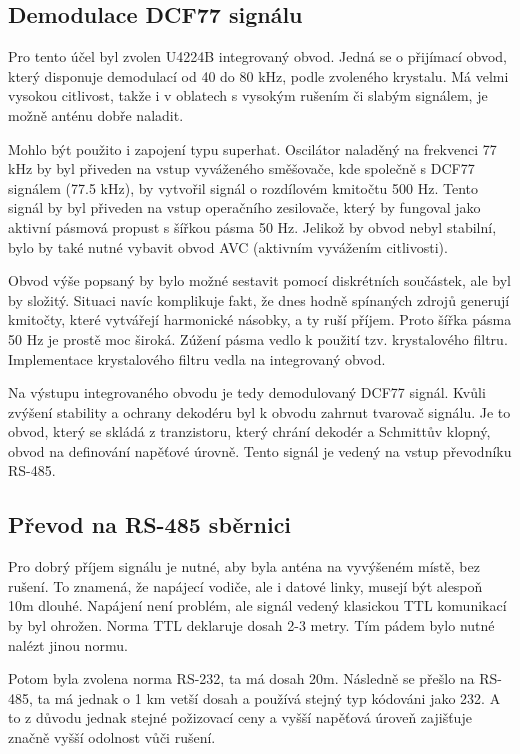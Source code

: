 \subsection{Demodulace DCF77 signálu}
    Pro tento účel byl zvolen U4224B integrovaný obvod. Jedná se o přijímací obvod, který
    disponuje demodulací od 40 do 80 kHz, podle zvoleného krystalu. Má velmi vysokou
    citlivost, takže i v oblatech s vysokým rušením či slabým signálem, je možně anténu
    dobře naladit.

    Mohlo být použito i zapojení typu superhat. Oscilátor naladěný na frekvenci 77 kHz by
    byl přiveden na vstup vyváženého směšovače, kde společně s DCF77 signálem (77.5 kHz),
    by vytvořil signál o rozdílovém kmitočtu 500 Hz. Tento signál by byl přiveden na
    vstup operačního zesilovače, který by fungoval jako aktivní pásmová propust s šířkou
    pásma 50 Hz. Jelikož by obvod nebyl stabilní, bylo by také nutné vybavit obvod AVC
    (aktivním vyvážením citlivosti).

    Obvod výše popsaný by bylo možné sestavit pomocí diskrétních součástek, ale byl by
    složitý. Situaci navíc komplikuje fakt, že dnes hodně spínaných zdrojů generují
    kmitočty, které vytvářejí harmonické násobky, a ty ruší příjem. Proto šířka pásma 50
    Hz je prostě moc široká. Zúžení pásma vedlo k použití tzv. krystalového filtru.
    Implementace krystalového filtru vedla na integrovaný obvod.

    Na výstupu integrovaného obvodu je tedy demodulovaný DCF77 signál. Kvůli zvýšení
    stability a ochrany dekodéru byl k obvodu zahrnut tvarovač signálu. Je to obvod, který
    se skládá z tranzistoru, který chrání dekodér a Schmittův klopný, obvod na definování
    napěťové úrovně. Tento signál je vedený na vstup převodníku RS-485.

\subsection{Převod na RS-485 sběrnici}
    Pro dobrý příjem signálu je nutné, aby byla anténa na vyvýšeném místě, bez rušení.
    To znamená, že napájecí vodiče, ale i datové linky, musejí být alespoň 10m dlouhé.
    Napájení není problém, ale signál vedený klasickou TTL komunikací by byl ohrožen.
    Norma TTL deklaruje dosah 2-3 metry. Tím pádem bylo nutné nalézt jinou normu.

    Potom byla zvolena norma RS-232, ta má dosah 20m. Následně se přešlo na RS-485, ta má
    jednak o 1 km vetší dosah a používá stejný typ kódováni jako 232. A to z důvodu jednak
    stejné požizovací ceny a vyšší napěťová úroveň zajišťuje značně vyšší odolnost vůči
    rušení.

